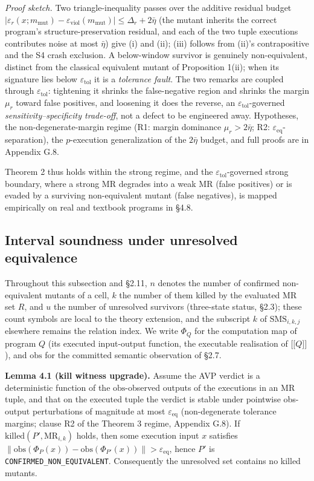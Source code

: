 \documentclass[manuscript,screen,review]{acmart}
\begin{document}
\emph{Proof sketch.} Two triangle-inequality passes over the additive
residual budget
$|\varepsilon_r(x;m_{\mathrm{mut}})-\varepsilon_{\mathrm{viol}}(m_{\mathrm{mut}})|\le\Delta_r+2\bar\eta$
(the mutant inherits the correct program's structure-preservation
residual, and each of the two tuple executions contributes noise at most
$\bar\eta$) give (i) and (ii); (iii) follows from (ii)'s contrapositive
and the S4 crash exclusion. A below-window survivor is genuinely
non-equivalent, distinct from the classical equivalent mutant of
Proposition 1(ii); when its signature lies below
$\varepsilon_{\mathrm{tol}}$ it is a \emph{tolerance fault}. The two
remarks are coupled through $\varepsilon_{\mathrm{tol}}$: tightening it
shrinks the false-negative region and shrinks the margin $\mu_r$ toward
false positives, and loosening it does the reverse, an
$\varepsilon_{\mathrm{tol}}$-governed
\emph{sensitivity--specificity trade-off}, not a defect to be engineered
away. Hypotheses, the non-degenerate-margin regime (R1: margin dominance
$\mu_r>2\bar\eta$; R2: $\varepsilon_{\mathrm{eq}}$-separation), the
$p$-execution generalization of the $2\bar\eta$ budget, and full proofs
are in Appendix G.8.

Theorem 2 thus holds within the strong regime, and the
$\varepsilon_{\mathrm{tol}}$-governed strong boundary, where a strong
MR degrades into a weak MR (false positives) or is evaded by a surviving
non-equivalent mutant (false negatives), is mapped empirically on real
and textbook programs in §4.8.

\subsection{Interval soundness under unresolved equivalence}\label{theory-interval}

Throughout this subsection and §2.11, $n$ denotes the number of
confirmed non-equivalent mutants of a cell, $k$ the number of them
killed by the evaluated MR set $R$, and $u$ the number of unresolved
survivors (three-state status, §2.3); these count symbols are local to
the theory extension, and the subscript $k$ of
$\mathrm{SMS}_{i,k,j}$ elsewhere remains the relation index. We write
$\Phi_Q$ for the computation map of program $Q$ (its executed
input-output function, the executable realisation of
$\mathopen{\lbrack\!\lbrack} Q \mathclose{\rbrack\!\rbrack}$), and
$\mathrm{obs}$ for the committed semantic observation of §2.7.

\textbf{Lemma 4.1 (kill witness upgrade).} Assume the AVP verdict is a
deterministic function of the $\mathrm{obs}$-observed outputs of the
executions in an MR tuple, and that on the executed tuple the verdict is
stable under pointwise obs-output perturbations of magnitude at most
$\varepsilon_{\mathrm{eq}}$ (non-degenerate tolerance margins; clause R2
of the Theorem 3 regime, Appendix G.8). If
$\mathrm{killed}(P',\mathrm{MR}_{i,k})$ holds, then some execution input
$x$ satisfies
$\|\mathrm{obs}(\Phi_{P}(x))-\mathrm{obs}(\Phi_{P'}(x))\|>\varepsilon_{\mathrm{eq}}$,
hence $P'$ is \texttt{CONFIRMED\_NON\_EQUIVALENT}. Consequently the
unresolved set contains no killed mutants.
\end{document}
